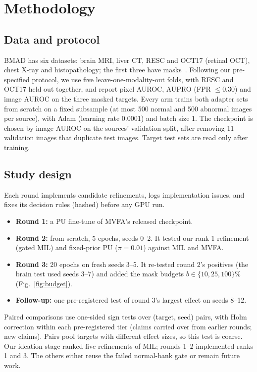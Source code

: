 \documentclass[10pt,twocolumn,letterpaper]{article}
\begin{document}
\section{Methodology}
\label{sec:method}
\subsection{Data and protocol}
BMAD has six datasets: brain MRI, liver CT, RESC and OCT17 (retinal OCT), chest X-ray and histopathology; the first three have masks~\cite{bmad2024}. Following our pre-specified protocol, we use five leave-one-modality-out folds, with RESC and OCT17 held out together, and report pixel AUROC, AUPRO (FPR $\le 0.30$) and image AUROC on the three masked targets. Every arm trains both adapter sets from scratch on a fixed subsample (at most 500 normal and 500 abnormal images per source), with Adam (learning rate 0.0001) and batch size 1. The checkpoint is chosen by image AUROC on the sources' validation split, after removing 11 validation images that duplicate test images. Target test sets are read only after training.

\subsection{Study design}
Each round implements candidate refinements, logs implementation issues, and fixes its decision rules (hashed) before any GPU run.
\begin{itemize}
\item \textbf{Round 1:} a PU fine-tune of MVFA's released checkpoint.
\item \textbf{Round 2:} from scratch, 5 epochs, seeds 0--2. It tested our rank-1 refinement (gated MIL) and fixed-prior PU ($\pi=0.01$) against MIL and MVFA.
\item \textbf{Round 3:} 20 epochs on fresh seeds 3--5. It re-tested round 2's positives (the brain test used seeds 3--7) and added the mask budgets $b\in\{10,25,100\}\%$ (Fig.~\ref{fig:budget}).
\item \textbf{Follow-up:} one pre-registered test of round 3's largest effect on seeds 8--12.
\end{itemize}
Paired comparisons use one-sided sign tests over (target, seed) pairs, with Holm correction within each pre-registered tier (claims carried over from earlier rounds; new claims). Pairs pool targets with different effect sizes, so this test is coarse. Our ideation stage ranked five refinements of MIL; rounds 1--2 implemented ranks 1 and 3. The others either reuse the failed normal-bank gate or remain future work.
\end{document}
